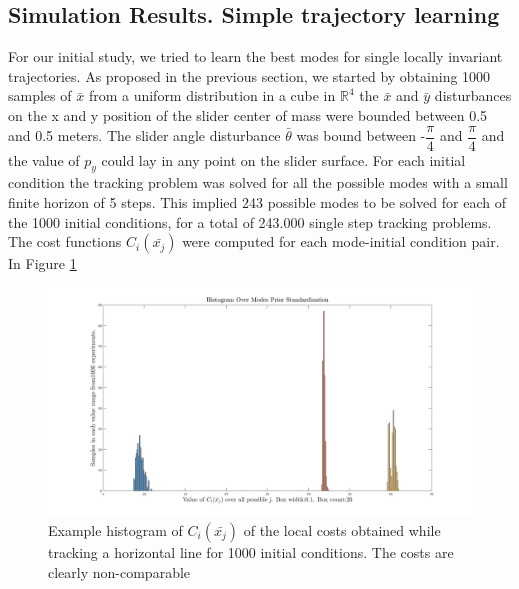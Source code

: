 \documentclass[12,twoside]{TFG-GM}
\theoremstyle{definition}
\theoremstyle{remark}
\newcommand*\diff[1]{\bar{#1}}
\begin{document}
\subsection{Simulation Results. Simple trajectory learning}
\label{subsec:learningsimple}
For our initial study, we tried to learn the best modes for single locally invariant trajectories. As proposed in the previous section, we started by obtaining 1000 samples of $\diff{x}$ from a uniform distribution in a cube in $\mathbb{R}^4$ the $\diff{x}$ and $\diff{y}$ disturbances on the x and y position of the slider center of mass were bounded between 0.5 and 0.5 meters. The slider angle disturbance $\diff{\theta}$ was bound between -$\dfrac{\pi}{4}$ and $\dfrac{\pi}{4}$ and the value of $p_y$ could lay in any point on the slider surface. For each initial condition the tracking problem was solved for all the possible modes with a small finite horizon of 5 steps. This implied 243 possible modes to be solved for each of the 1000 initial conditions, for a total of 243.000 single step tracking problems. The cost functions $C_i(\diff{x_j})$ were computed for each mode-initial condition pair. In Figure \ref{fig:hist_pre} 

\begin{figure}[htb!]
\begin{center}
\includegraphics[width=16cm]{hist_pre_std.jpg}
\end{center}
\caption{\label{fig:hist_pre} \small Example histogram of $C_i(\diff{x_j})$ of the local costs obtained while tracking a horizontal line for 1000 initial conditions. The costs are clearly non-comparable}
\end{figure}

\end{document}
